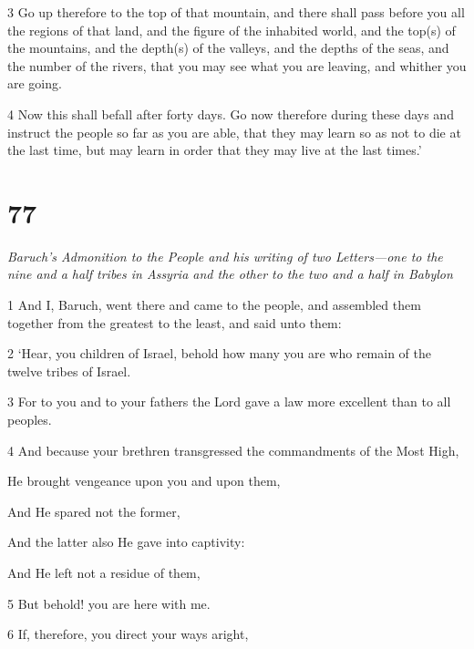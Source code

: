 \par 3 Go up therefore to the top of that mountain, and there shall pass before you all the regions of that land, and the figure of the inhabited world, and the top(s) of the mountains, and the depth(s) of the valleys, and the depths of the seas, and the number of the rivers, that you may see what you are leaving, and whither you are going. 

\par 4 Now this shall befall after forty days. Go now therefore during these days and instruct the people so far as you are able, that they may learn so as not to die at the last time, but may learn in order that they may live at the last times.’

\chapter{77}

\par \textit{Baruch's Admonition to the People and his writing of two Letters—one to the nine and a half tribes in Assyria and the other to the two and a half in Babylon}


\par 1 And I, Baruch, went there and came to the people, and assembled them together from the greatest to the least, and said unto them: 

\par 2 ‘Hear, you children of Israel, behold how many you are who remain of the twelve tribes of Israel. 

\par 3 For to you and to your fathers the Lord gave a law more excellent than to all peoples. 

\par 4 And because your brethren transgressed the commandments of the Most High,

\par He brought vengeance upon you and upon them,

\par And He spared not the former,

\par And the latter also He gave into captivity:

\par And He left not a residue of them,

\par 5 But behold! you are here with me.

\par 6 If, therefore, you direct your ways aright,

